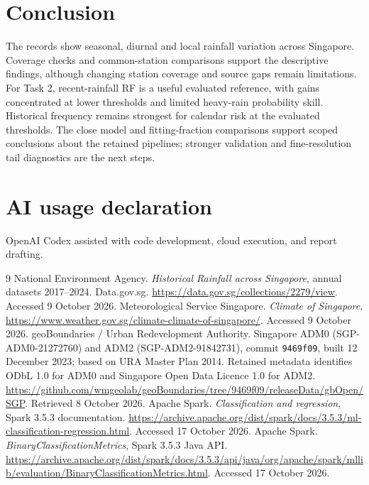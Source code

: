 \documentclass[11pt,a4paper]{article}
\begin{document}
\section{Conclusion}
The records show seasonal, diurnal and local rainfall variation across Singapore. Coverage checks and common-station comparisons support the descriptive findings, although changing station coverage and source gaps remain limitations. For Task 2, recent-rainfall RF is a useful evaluated reference, with gains concentrated at lower thresholds and limited heavy-rain probability skill. Historical frequency remains strongest for calendar risk at the evaluated thresholds. The close model and fitting-fraction comparisons support scoped conclusions about the retained pipelines; stronger validation and fine-resolution tail diagnostics are the next steps.

\par\noindent\begin{minipage}{\linewidth}
\section*{AI usage declaration}
OpenAI Codex assisted with code development, cloud execution, and report drafting.
\end{minipage}

\begingroup\small\raggedright
\begin{thebibliography}{9}
 National Environment Agency. \emph{Historical Rainfall across Singapore}, annual datasets 2017--2024. Data.gov.sg. \url{https://data.gov.sg/collections/2279/view}. Accessed 9 October 2026.
 Meteorological Service Singapore. \emph{Climate of Singapore}. \url{https://www.weather.gov.sg/climate-climate-of-singapore/}. Accessed 9 October 2026.
 geoBoundaries / Urban Redevelopment Authority. Singapore ADM0 (SGP-ADM0-21272760) and ADM2 (SGP-ADM2-91842731), commit \texttt{9469f09}, built 12 December 2023; based on URA Master Plan 2014. Retained metadata identifies ODbL 1.0 for ADM0 and Singapore Open Data Licence 1.0 for ADM2. \url{https://github.com/wmgeolab/geoBoundaries/tree/9469f09/releaseData/gbOpen/SGP}. Retrieved 8 October 2026.
 Apache Spark. \emph{Classification and regression}, Spark 3.5.3 documentation. \url{https://archive.apache.org/dist/spark/docs/3.5.3/ml-classification-regression.html}. Accessed 17 October 2026.
 Apache Spark. \emph{BinaryClassificationMetrics}, Spark 3.5.3 Java API. \url{https://archive.apache.org/dist/spark/docs/3.5.3/api/java/org/apache/spark/mllib/evaluation/BinaryClassificationMetrics.html}. Accessed 17 October 2026.
\end{thebibliography}
\endgroup
\clearpage
\appendix
{}
\setcounter{figure}{0}
\setcounter{table}{0}
\renewcommand{\thefigure}{\Alph{section}.\arabic{figure}}
\end{document}

